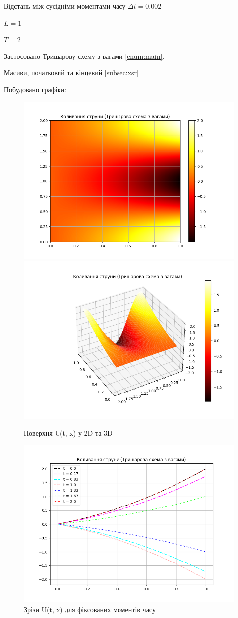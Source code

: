 \documentclass{article}
\begin{document}
        Відстань між сусідніми моментами часу $ \Delta{t} = 0.002 $

        $ L = 1 $

        $ T = 2 $

        Застосовано Тришарову схему з вагами \eqref{enum:main}.

        Масиви, початковий та кінцевий \eqref{subsec:xsr}

        Побудовано графіки:

        \begin{figure}[h!]
            \includegraphics[width=0.5\linewidth]{Main_2d.png}
            \includegraphics[width=0.5\linewidth]{Main_3d.png}
            \caption{Поверхня U(t, x) у 2D та 3D}
        \end{figure}

        \begin{figure}[h!]
            \centering
            \includegraphics[width=0.5\linewidth]{Main_key_time.png}
            \caption{Зрізи U(t, x) для фіксованих моментів часу}
        \end{figure}
\end{document}
